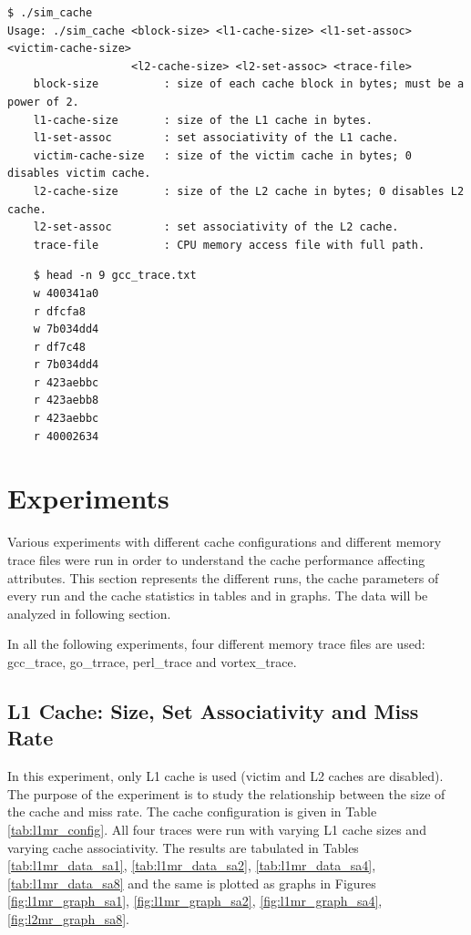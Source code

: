 \documentclass[a4paper]{article}
\begin{document}
\begin{verbatim}
$ ./sim_cache 
Usage: ./sim_cache <block-size> <l1-cache-size> <l1-set-assoc> <victim-cache-size>
                   <l2-cache-size> <l2-set-assoc> <trace-file>
    block-size          : size of each cache block in bytes; must be a power of 2.
    l1-cache-size       : size of the L1 cache in bytes.
    l1-set-assoc        : set associativity of the L1 cache.
    victim-cache-size   : size of the victim cache in bytes; 0 disables victim cache.
    l2-cache-size       : size of the L2 cache in bytes; 0 disables L2 cache.
    l2-set-assoc        : set associativity of the L2 cache.
    trace-file          : CPU memory access file with full path.

\end{verbatim}

\begin{verbatim}
    $ head -n 9 gcc_trace.txt 
    w 400341a0
    r dfcfa8
    w 7b034dd4
    r df7c48
    r 7b034dd4
    r 423aebbc
    r 423aebb8
    r 423aebbc
    r 40002634
\end{verbatim}


\section{Experiments}
Various experiments with different cache configurations and different memory trace files were run in order to understand the cache performance affecting attributes. This section represents the different runs, the cache parameters of every run and the cache statistics in tables and in graphs. The data will be analyzed in following section.

In all the following experiments, four different memory trace files are used: gcc\_trace, go\_trrace, perl\_trace and vortex\_trace.

\subsection{L1 Cache: Size, Set Associativity and Miss Rate}
In this experiment, only L1 cache is used (victim and L2 caches are disabled). The purpose of the experiment is to study the relationship between the size of the cache and miss rate. The cache configuration is given in Table \ref{tab:l1mr_config}. All four traces were run with varying L1 cache sizes and varying cache associativity. The results are tabulated in Tables \ref{tab:l1mr_data_sa1}, \ref{tab:l1mr_data_sa2}, \ref{tab:l1mr_data_sa4}, \ref{tab:l1mr_data_sa8} and the same is plotted as graphs in Figures \ref{fig:l1mr_graph_sa1}, \ref{fig:l1mr_graph_sa2}, \ref{fig:l1mr_graph_sa4}, \ref{fig:l2mr_graph_sa8}.
\end{document}

